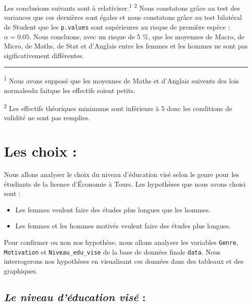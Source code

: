 \documentclass[
  11pt,
  french,
]{article}
\providecommand{\tightlist}{%
  \setlength{\itemsep}{0pt}\setlength{\parskip}{0pt}}
\begin{document}
Les conclusions suivants sont à relativiser.\textsuperscript{1}
\textsuperscript{2} Nous constatons grâce au test des variances que ces
dernières sont égales et nous constatons grâce au test bilatéral de
Student que les \texttt{p.values} sont supérieures au risque de première
espèce : \(\alpha = 0.05\). Nous concluons, avec un risque de 5 \%, que
les moyennes de Macro, de Micro, de Maths, de Stat et d'Anglais entre
les femmes et les hommes ne sont pas sigificativement différentes.

\begin{center}\rule{0.5\linewidth}{0.5pt}\end{center}

\textsuperscript{1} Nous avons supposé que les moyennes de Maths et
d'Anglais suivents des lois normalesdu faitque les effectifs soient
petits.

\textsuperscript{2} Les effectifs théoriques minimums sont inférieurs à
5 donc les conditions de validité ne sont pas remplies.

\hypertarget{les-choix}{%
\section{Les choix :}\label{les-choix}}

Nous allons analyser le choix du niveau d'éducation visé selon le genre
pour les étudiants de la licence d'Économie à Tours. Les hypothèses que
nous avons choisi sont :

\begin{itemize}
\tightlist
\item
  Les femmes veulent faire des études plus longues que les hommes.
\item
  Les femmes et les hommes motivés veulent faire des études plus
  longues.
\end{itemize}

Pour confirmer ou non nos hypothèse, nous allons analyser les variables
\texttt{Genre}, \texttt{Motivation} et \texttt{Niveau\_edu\_vise} de la
base de données finale \texttt{data}. Nous interrogerons nos hypothèses
en visualisant ces données dans des tableaux et des graphiques.

\hypertarget{le-niveau-duxe9ducation-visuxe9}{%
\subsection{\texorpdfstring{\emph{Le niveau d'éducation visé}
:}{Le niveau d'éducation visé :}}\label{le-niveau-duxe9ducation-visuxe9}}
\end{document}

